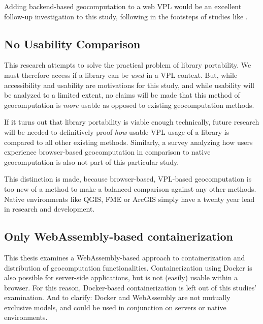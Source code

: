 Adding backend-based geocomputation to a web VPL would be an excellent follow-up investigation to this study, following in the footsteps of studies like \cite{panidi_hybrid_2015}. 

\subsection*{No Usability Comparison} %

This research attempts to solve the practical problem of library portability. 
We must therefore access if a library can be \emph{used} in a VPL context. 
But, while accessibility and usability are motivations for this study, and while usability will be analyzed to a limited extent, no claims will be made that this method of geocomputation is \emph{more} usable as opposed to existing geocomputation methods. 

If it turns out that library portability is viable enough technically, future research will be needed to definitively proof \emph{how} usable VPL usage of a library is compared to all other existing methods. 
Similarly, a survey analyzing how users experience browser-based geocomputation in comparison to native geocomputation is also not part of this particular study.  

This distinction is made, because browser-based, VPL-based geocomputation is too new of a method to make a balanced comparison against any other methods. 
Native environments like QGIS, FME or ArcGIS simply have a twenty year lead in research and development. 




\subsection*{Only WebAssembly-based containerization}

This thesis examines a WebAssembly-based approach to containerization and distribution of geocomputation functionalities. 
Containerization using Docker is also possible for server-side applications, but is not (easily) usable within a browser. 
For this reason, Docker-based containerization is left out of this studies' examination. 
And to clarify: Docker and WebAssembly are not mutually exclusive models, and could be used in conjunction on servers or native environments. 

